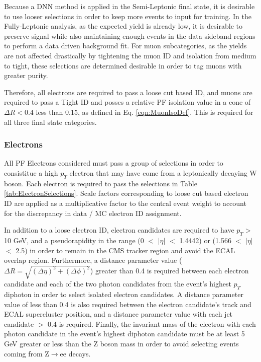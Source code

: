 Because a DNN method is applied in the Semi-Leptonic final state, it is desirable to use looser selections in order to keep more events to input for training. In the Fully-Leptonic analysis,
as the expected yield is already low, it is desirable to preserve signal while also maintaining enough events in the data sideband regions to perform a data driven background fit. For muon subcategories,
as the yields are not affected drastically by tightening the muon ID and isolation from medium to tight, these selections are determined desirable in order to tag muons with
greater purity.

Therefore, all electrons are required to pass a loose cut based ID, and muons are required to pass a Tight ID and posses a relative PF isolation value in a cone of $\Delta R < 0.4$ less than 0.15, as defined in Eq. \ref{eqn:MuonIsoDef}. This is
required for all three final state categories.

\subsubsection{Electrons}

All PF Electrons considered must pass a group of selections in order to consistitue a high $p_{T}$ electron that may have come from a leptonically decaying W boson.
Each electron is required to pass the selections in Table \ref{tab:ElectronSelections}. Scale factors corresponding to loose cut based electron ID are applied as a multiplicative factor to
the central event weight to account for the discrepancy in data / MC electron ID assignment. 

In addition to a loose electron ID, electron candidates are required to have $p_{T} > $ 10 GeV, and a pseudorapidity in the range (0 $<$ $|\eta|$ $<$ 1.4442) or (1.566 $<$ $|\eta|$ $<$ 2.5) in order to remain in the CMS tracker region and avoid the ECAL overlap region. Furthermore, a distance parameter value ($\Delta R = \sqrt{(\Delta\eta)^{2} + (\Delta\phi)^{2}}$) greater than 
0.4 is required between each electron candidate and each of the two photon candidates from the event's highest $p_{T}$ diphoton in order to select isolated electron candidates. A distance parameter value 
of less than 0.4 is also required between the electron candidate's track and ECAL supercluster position, and a 
distance parameter value with each jet candidate $>$ 0.4 is required. Finally, the invariant mass of the electron with each photon candidate in the event's highest \pt diphoton 
candidate must be at least 5 GeV greater or less than the Z boson mass in order to avoid selecting events coming from Z$\rightarrow$ee decays. 

